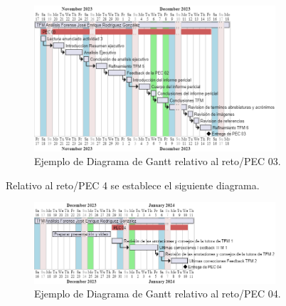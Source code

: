 \begin{figure}[htp]
    \centering
    \includegraphics[width=0.8\textwidth]{imagenes/005-diagrama-de-gantt-pec-03.png} 
    \caption{Ejemplo de Diagrama de Gantt relativo al reto/PEC 03.}
    \label{fig:ejemplo_gantt}
\end{figure}


\clearpage

\noindent Relativo al reto/PEC 4 se establece el siguiente diagrama.

\begin{figure}[htp]
    \centering
    \includegraphics[width=0.8\textwidth]{imagenes/006-diagrama-de-gantt-pec-04.png} 
    \caption{Ejemplo de Diagrama de Gantt relativo al reto/PEC 04.}
    \label{fig:ejemplo_gantt}
\end{figure}

